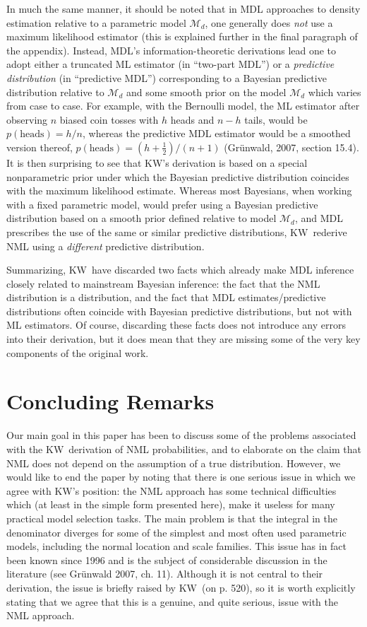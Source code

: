 \documentclass[authoryear]{elsarticle}
\newcommand{\model}{\mathcal{M}}
\newcommand{\kw}{KW}
\begin{document}
In much the same manner, it should be noted that in MDL approaches to density
estimation relative to a parametric model $\model_d$, one generally
does {\em not\/} use a maximum likelihood estimator (this is explained
further in the final paragraph of the appendix). Instead, MDL's
information-theoretic derivations lead one to adopt either a truncated
ML estimator (in ``two-part MDL'') or a {\em predictive
  distribution\/} (in ``predictive MDL'') corresponding to a Bayesian
predictive distribution relative to $\model_d$ and some smooth prior
on the model $\model_d$ which varies from case to case. For example,
with the Bernoulli model, the ML estimator after observing $n$ biased
coin tosses with $h$ heads and $n-h$ tails, would be $p(\mbox{heads})
= h/n$, whereas the predictive MDL estimator would be a smoothed
version thereof, $p(\mbox{heads}) = (h+\frac{1}{2})/(n+1)$ (Gr\"unwald, 2007,
section 15.4). It is then surprising to see that \kw's derivation is
based on a special nonparametric prior under which the Bayesian
predictive distribution coincides with the maximum likelihood
estimate. Whereas most Bayesians, when working with a fixed parametric
model, would prefer using a Bayesian predictive distribution based on
a smooth prior defined relative to model $\model_d$, and MDL
prescribes the use of the same or similar predictive distributions,
\kw\ rederive NML using a {\em different\/} predictive distribution.

Summarizing, \kw\ have discarded two facts which already make MDL inference
closely related to mainstream Bayesian inference: the fact that the NML
distribution is a distribution, and the fact that MDL
estimates/predictive distributions often coincide with Bayesian
predictive distributions, but not with ML estimators. Of course,
discarding these facts does not introduce any errors into their
derivation, but it does mean that they are  missing
some of the very key components of the original work.



\section{Concluding Remarks}
\label{sec:undefined}

Our main goal in this paper has been to discuss some of the problems
associated with the \kw\ derivation of NML probabilities, and to
elaborate on the claim that NML does not depend on the assumption of a
true distribution. However, we would like to end the paper by
noting that there is one serious issue in which we agree with \kw's
position: the NML approach has some technical difficulties which (at
least in the simple form presented here), make it useless for many
practical model selection tasks. The main problem is that the integral
in the denominator diverges for some of the simplest and most often
used parametric models, including the normal location and scale
families. This issue has in fact been known since 1996 and is the
subject of considerable discussion in the literature (see Gr\"unwald
2007, ch. 11). Although it is not central to their derivation, the
issue is briefly raised by \kw\ (on p. 520), so it is worth explicitly
stating that we agree that this is a genuine, and quite serious, issue
with the NML approach.
\end{document}
